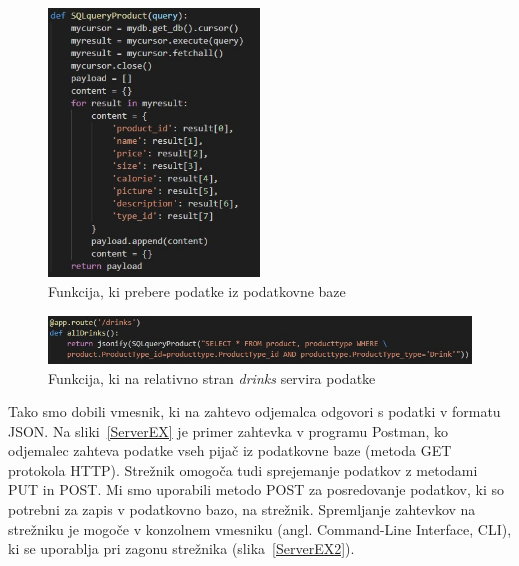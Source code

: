 \documentclass[a4paper, 12pt]{book}
\begin{document}
\begin{figure}[!htb]
\begin{center}
\includegraphics[width=0.5\textwidth]{drinks_1.jpg}
\caption{Funkcija, ki prebere podatke iz podatkovne baze}
\label{Drinks_DB_function}
\end{center}
\end{figure}

\begin{figure}[!htb]
\begin{center}
\includegraphics[width=14cm]{drinks_2.jpg}
\caption{Funkcija, ki na relativno stran \textit{drinks} servira podatke}
\label{Drinks_URI}
\end{center}
\end{figure}

Tako smo dobili vmesnik, ki na zahtevo odjemalca odgovori s podatki v formatu JSON. Na sliki~\ref{ServerEX} je primer zahtevka v programu Postman, ko odjemalec zahteva podatke vseh pijač iz podatkovne baze (metoda GET protokola HTTP). Strežnik omogoča tudi sprejemanje podatkov z metodami PUT in POST. Mi smo uporabili metodo POST za posredovanje podatkov, ki so potrebni za zapis v podatkovno bazo, na strežnik. Spremljanje zahtevkov na strežniku je mogoče v konzolnem vmesniku (angl. Command-Line Interface, CLI), ki se uporablja pri zagonu strežnika (slika~\ref{ServerEX2}).
\end{document}
